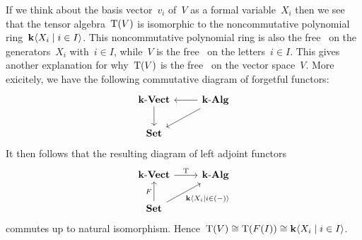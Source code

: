 \begin{recall}
\begin{description}
      If we think about the basis vector~$v_i$ of~$V$ as a formal variable~$X_i$ then we see that the tensor algebra~$\operatorname{T}(V)$ is isomorphic to the noncommutative polynomial ring~$\kf\gen{X_i \suchthat i \in I}$.
      This noncommutative polynomial ring is also the free~{\algebra{$\kf$}} on the generators~$X_i$ with~$i \in I$, while~$V$ is the free~{\vectorspace{$\kf$}} on the letters~$i \in I$.
      This gives another explanation for why~$\operatorname{T}(V)$ is the free~{\algebra{$\kf$}} on the vector space~$V$.
      More exicitely, we have the following commutative diagram of forgetful functors:
      \[
        \begin{tikzcd}
          \cVect{\kf}
          \arrow{d}
          &
          \cAlg{\kf}
          \arrow{l}
          \arrow{dl}
          \\
          \cSet
          &
          {}
        \end{tikzcd}
      \]
      It then follows that the resulting diagram of left adjoint functors
      \[
        \begin{tikzcd}
          \cVect{\kf}
          \arrow{r}[above]{\Tensor}
          &
          \cAlg{\kf}
          \\
          \cSet
          \arrow{u}[left]{F}
          \arrow{ur}[below right]{\kf\gen{X_i \suchthat i \in (-)}}
          &
          {}
        \end{tikzcd}
      \]
      commutes up to natural isomorphism.
      Hence~$\Tensor(V) \cong \Tensor(F(I)) \cong \kf\gen{X_i \suchthat i \in I}$.
  \end{description}
\end{recall}


